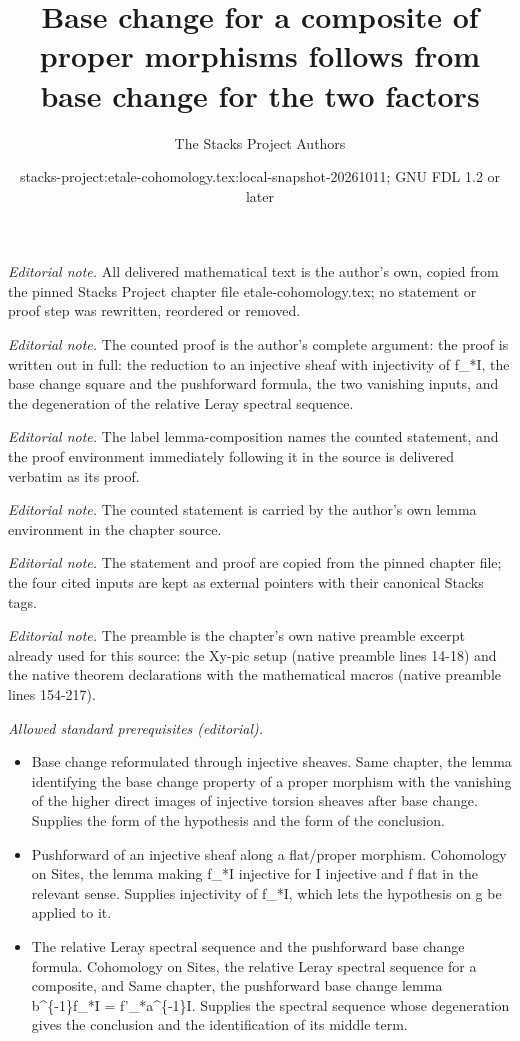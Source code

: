 \documentclass[10pt,a4paper]{amsart}
\title{Base change for a composite of proper morphisms follows from base change for the two factors}
\author{The Stacks Project Authors}
\date{stacks-project:etale-cohomology.tex:local-snapshot-20261011; GNU FDL 1.2 or later}
\theoremstyle{plain}
\theoremstyle{definition}
\theoremstyle{remark}
\numberwithin{equation}{subsection}
\begin{document}
\maketitle
\noindent\textit{Editorial note.} All delivered mathematical text is the author's own, copied from the pinned Stacks Project chapter file etale-cohomology.tex; no statement or proof step was rewritten, reordered or removed.\par\medskip
\noindent\textit{Editorial note.} The counted proof is the author's complete argument: the proof is written out in full: the reduction to an injective sheaf with injectivity of f\_*I, the base change square and the pushforward formula, the two vanishing inputs, and the degeneration of the relative Leray spectral sequence.\par\medskip
\noindent\textit{Editorial note.} The label lemma-composition names the counted statement, and the proof environment immediately following it in the source is delivered verbatim as its proof.\par\medskip
\noindent\textit{Editorial note.} The counted statement is carried by the author's own lemma environment in the chapter source.\par\medskip
\noindent\textit{Editorial note.} The statement and proof are copied from the pinned chapter file; the four cited inputs are kept as external pointers with their canonical Stacks tags.\par\medskip
\noindent\textit{Editorial note.} The preamble is the chapter's own native preamble excerpt already used for this source: the Xy-pic setup (native preamble lines 14-18) and the native theorem declarations with the mathematical macros (native preamble lines 154-217).\par\medskip
\noindent\textit{Allowed standard prerequisites (editorial).}\begin{itemize}
\item Base change reformulated through injective sheaves. Same chapter, the lemma identifying the base change property of a proper morphism with the vanishing of the higher direct images of injective torsion sheaves after base change. Supplies the form of the hypothesis and the form of the conclusion.
\item Pushforward of an injective sheaf along a flat/proper morphism. Cohomology on Sites, the lemma making f\_*I injective for I injective and f flat in the relevant sense. Supplies injectivity of f\_*I, which lets the hypothesis on g be applied to it.
\item The relative Leray spectral sequence and the pushforward base change formula. Cohomology on Sites, the relative Leray spectral sequence for a composite, and Same chapter, the pushforward base change lemma b\textasciicircum{}\{-1\}f\_*I = f'\_*a\textasciicircum{}\{-1\}I. Supplies the spectral sequence whose degeneration gives the conclusion and the identification of its middle term.
\end{itemize}\medskip
\end{document}

